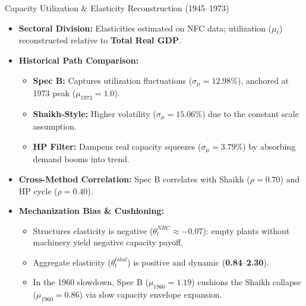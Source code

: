 \documentclass[10pt]{beamer}
\begin{document}
\begin{frame}{Capacity Utilization \& Elasticity Reconstruction (1945--1973)}
  \small
  \begin{itemize}\itemsep0.2em
    \item \textbf{Sectoral Division:} Elasticities estimated on NFC data; utilization ($\mu_t$) reconstructed relative to \textbf{Total Real GDP}.
    \item \textbf{Historical Path Comparison:}
      \begin{itemize}\itemsep0.1em
        \item \textbf{Spec B:} Captures utilization fluctuations ($\sigma_{\mu} = 12.98\%$), anchored at 1973 peak ($\mu_{1973}=1.0$).
        \item \textbf{Shaikh-Style:} Higher volatility ($\sigma_{\mu} = 15.06\%$) due to the constant scale assumption.
        \item \textbf{HP Filter:} Dampens real capacity squeezes ($\sigma_{\mu} = 3.79\%$) by absorbing demand booms into trend.
      \end{itemize}
    \item \textbf{Cross-Method Correlation:} Spec B correlates with Shaikh ($\rho = 0.70$) and HP cycle ($\rho = 0.40$).
    \item \textbf{Mechanization Bias \& Cushioning:}
      \begin{itemize}\itemsep0.1em
        \item Structures elasticity is negative ($\theta^{NRC}_t \approx -0.07$): empty plants without machinery yield negative capacity payoff.
        \item Aggregate elasticity ($\theta^{total}_t$) is positive and dynamic (\textbf{0.84}--\textbf{2.30}).
        \item In the 1960 slowdown, Spec B ($\mu_{1960} = 1.19$) cushions the Shaikh collapse ($\mu_{1960} = 0.86$) via slow capacity envelope expansion.
      \end{itemize}
  \end{itemize}
\end{frame}
\end{document}
